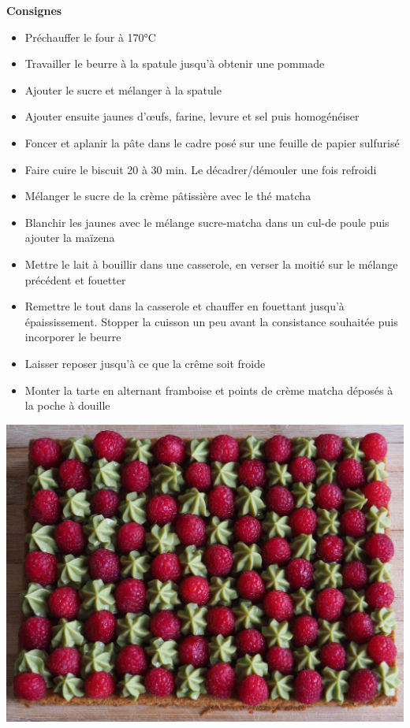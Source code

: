 \documentclass[]{book}
\providecommand{\tightlist}{%
  \setlength{\itemsep}{0pt}\setlength{\parskip}{0pt}}
\begin{document}
\textbf{Consignes}

\begin{itemize}
\tightlist
\item
  Préchauffer le four à 170°C
\item
  Travailler le beurre à la spatule jusqu'à obtenir une pommade
\item
  Ajouter le sucre et mélanger à la spatule
\item
  Ajouter ensuite jaunes d'œufs, farine, levure et sel puis homogénéiser
\item
  Foncer et aplanir la pâte dans le cadre posé sur une feuille de papier sulfurisé
\item
  Faire cuire le biscuit 20 à 30 min. Le décadrer/démouler une fois refroidi
\item
  Mélanger le sucre de la crème pâtissière avec le thé matcha
\item
  Blanchir les jaunes avec le mélange sucre-matcha dans un cul-de poule puis ajouter la maïzena
\item
  Mettre le lait à bouillir dans une casserole, en verser la moitié sur le mélange précédent et fouetter
\item
  Remettre le tout dans la casserole et chauffer en fouettant jusqu'à épaississement. Stopper la cuisson un peu avant la consistance souhaitée puis incorporer le beurre
\item
  Laisser reposer jusqu'à ce que la crême soit froide
\item
  Monter la tarte en alternant framboise et points de crème matcha déposés à la poche à douille
\end{itemize}

\begin{center}\includegraphics[width=0.9\linewidth]{photos/framb_matcha1} \end{center}
\end{document}
